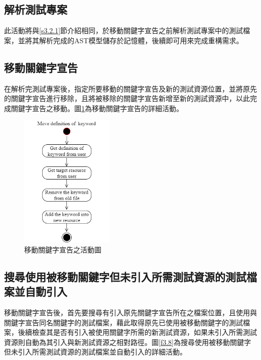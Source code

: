 \subsection{解析測試專案}
\indent
此活動將與\ref{s3.2.1}節介紹相同，於移動關鍵字宣告之前解析測試專案中的測試檔案，並將其解析完成的AST模型儲存於記憶體，後續即可用來完成重構需求。

\subsection{移動關鍵字宣告}\label{s3.3.2}
\indent
在解析完測試專案後，指定所要移動的關鍵字宣告及新的測試資源位置，並將原先的關鍵字宣告進行移除，且將被移除的關鍵字宣告新增至新的測試資源中，以此完成關鍵字宣告之移動。圖\ref{f3.7}為移動關鍵字宣告的詳細活動。

\begin{figure}[H]
    \centering
    \includegraphics[width=0.4\textwidth]{picture/Move_definition_of_keyword_2.png}
    \caption{移動關鍵字宣告之活動圖}
    \label{f3.7}
\end{figure}

\subsection{搜尋使用被移動關鍵字但未引入所需測試資源的測試檔案並自動引入}\label{s3.3.3}
\indent
移動關鍵字宣告後，首先要搜尋有引入原先關鍵字宣告所在之檔案位置，且使用與關鍵字宣告同名關鍵字的測試檔案，藉此取得原先已使用被移動關鍵字的測試檔案，後續檢查其是否有引入被使用關鍵字所需的新測試資源，如果未引入所需測試資源則自動為其引入與新測試資源之相對路徑。圖\ref{f3.8}為搜尋使用被移動關鍵字但未引入所需測試資源的測試檔案並自動引入的詳細活動。

